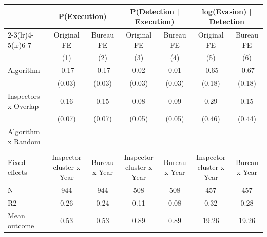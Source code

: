 \begin{tabular}{lcc|cc|cc} \toprule
\multicolumn{1}{l}{} & \multicolumn{2}{c}{P(Execution)} & \multicolumn{2}{c}{P(Detection | Execution)} & \multicolumn{2}{c}{log(Evasion) | Detection} \\\cmidrule(lr){2-3}\cmidrule(lr){4-5}\cmidrule(lr){6-7} \multicolumn{1}{l}{} & Original FE & Bureau FE & Original FE & Bureau FE & Original FE & Bureau FE \\ \multicolumn{1}{l}{} & (1) & (2) & (3) & (4) & (5) & (6) \\ \midrule
Algorithm   &       -0.17\sym{***}&       -0.17\sym{***}&        0.02         &        0.01         &       -0.65\sym{***}&       -0.67\sym{***}\\
            &      (0.03)         &      (0.03)         &      (0.03)         &      (0.03)         &      (0.18)         &      (0.18)         \\
\addlinespace
Inspectors x Overlap&        0.16\sym{**} &        0.15\sym{**} &        0.08         &        0.09\sym{*}  &        0.29         &        0.15         \\
            &      (0.07)         &      (0.07)         &      (0.05)         &      (0.05)         &      (0.46)         &      (0.44)         \\
\addlinespace
Algorithm x Random&                     &                     &                     &                     &                     &                     \\
            &                     &                     &                     &                     &                     &                     \\
\midrule
Fixed effects&Inspector cluster x Year         &Bureau x Year         &Inspector cluster x Year         &Bureau x Year         &Inspector cluster x Year         &Bureau x Year         \\
N           &         944         &         944         &         508         &         508         &         457         &         457         \\
R2          &        0.26         &        0.24         &        0.11         &        0.08         &        0.32         &        0.28         \\
Mean outcome&        0.53         &        0.53         &        0.89         &        0.89         &       19.26         &       19.26         \\
\bottomrule \end{tabular}
